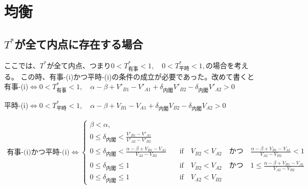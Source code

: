 \documentclass[main.tex]{subfiles}
\begin{document}
\section{均衡}


\subsection{$T^*$が全て内点に存在する場合}

\bigskip
ここでは、$T^*$が全て内点、つまり$0<T^*_{有事}<1,\quad 0<T^*_{平時}<1,$の場合を考える。
この時、有事-(i)かつ平時-(i)の条件の成立が必要であった。改めて書くと\\

有事-(i)$\Leftrightarrow 0<T^*_{有事}<1,\quad \alpha-\beta + V'_{B1}-V'_{A1} + \delta_{内閣}V'_{B2} - \delta_{内閣}V'_{A2} > 0$

平時-(i)$\Leftrightarrow 0<T^*_{平時}<1,\quad \alpha-\beta + V_{B1}-V_{A1} + \delta_{内閣}V_{B2} - \delta_{内閣}V_{A2} > 0$

\begin{align*}
    \text{有事-(i)かつ平時-(i)} \Leftrightarrow 
    \begin{cases}
        \beta < \alpha, \\
        0 \le \delta_{内閣} < \frac{V'_{B1}-V'_{A1}}{V'_{A2} - V'_{B2}}\\
        0 \le \delta_{内閣} < \frac{\alpha-\beta + V_{B1}-V_{A1}}{V_{A2} - V_{B2}} \quad&\text{if}\quad V_{B2} < V_{A2} \quad{かつ}\quad \frac{\alpha-\beta + V_{B1}-V_{A1}}{V_{A2} - V_{B2}}<1\\
        0 \le \delta_{内閣} \le 1 \quad&\text{if}\quad V_{B2} < V_{A2} \quad{かつ}\quad 1 \le \frac{\alpha-\beta + V_{B1}-V_{A1}}{V_{A2} - V_{B2}}\\
        0 \le \delta_{内閣} \le 1 \quad&\text{if}\quad V_{A2} < V_{B2}
    \end{cases}
\end{align*}
\end{document}
